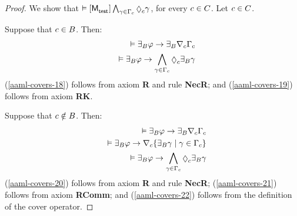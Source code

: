 \begin{proof}
We show that $\entails \actionA{\aPModel{\aStateTest}} \bigwedge_{\gamma \in \Gamma_\agentC} \possibleC \gamma$, for every $c \in C$.
Let $c \in C$.

Suppose that $c \in B$.
Then:
\begin{eqnarray}
    &&\entails \someactsBs \phi \implies \someactsBs \coversC \Gamma_\agentC \label{aaml-covers-18}\\
    &&\entails \someactsBs \phi \implies \bigwedge_{\gamma \in \Gamma_\agentC} \possibleC \someactsBs \gamma \label{aaml-covers-19}
\end{eqnarray}
(\ref{aaml-covers-18}) follows from \axiomRamlK{} axiom {\bf R} and rule {\bf NecR}; and
(\ref{aaml-covers-19}) follows from \axiomRamlK{} axiom {\bf RK}.

Suppose that $c \notin B$.
Then:
\begin{eqnarray}
    &&\entails \someactsBs \phi \implies \someactsBs \coversC \Gamma_\agentC \label{aaml-covers-20}\\
    &&\entails \someactsBs \phi \implies \coversC \{\someactsBs \gamma \mid \gamma \in \Gamma_\agentC \}\label{aaml-covers-21}\\
    &&\entails \someactsBs \phi \implies \bigwedge_{\gamma \in \Gamma_\agentC} \possibleC \someactsBs \gamma \label{aaml-covers-22}
\end{eqnarray}
(\ref{aaml-covers-20}) follows from \axiomRamlK{} axiom {\bf R} and rule {\bf NecR};
(\ref{aaml-covers-21}) follows from \axiomRamlK{} axiom {\bf RComm}; and
(\ref{aaml-covers-22}) follows from the definition of the cover operator.


\end{proof}
